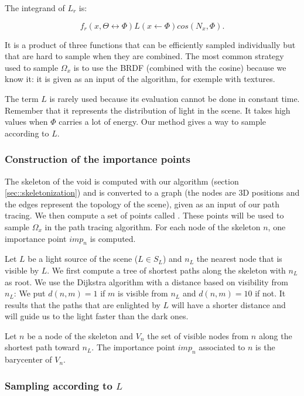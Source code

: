 The integrand of $L_r$ is:

\begin{equation*}
f_r(x, \Theta \leftrightarrow \Phi) L(x \leftarrow \Phi) cos(N_x, \Phi).
\end{equation*}

It is a product of three functions that can be efficiently sampled individually but that are hard to sample when they are combined. The most common strategy used to sample $\Omega_x$ is to use the BRDF (combined with the cosine) because we know it: it is given as an input of the algorithm, for exemple with textures.

The term $L$ is rarely used because its evaluation cannot be done in constant time. Remember that it represents the distribution of light in the scene. It takes high values when $\Phi$ carries a lot of energy. Our method gives a way to sample according to $L$.

\subsubsection{Construction of the importance points}

The skeleton of the void is computed with our algorithm (section \ref{sec::skeletonization}) and is converted to a graph (the nodes are 3D positions and the edges represent the topology of the scene), given as an input of our path tracing. We then compute a set of points called . These points will be used to sample $\Omega_x$ in the path tracing algorithm. For each node of the skeleton $n$, one importance point $imp_n$ is computed.

Let $L$ be a light source of the scene ($L \in S_L$) and $n_L$ the nearest node that is visible by $L$. We first compute a tree of shortest paths along the skeleton with $n_L$ as root. We use the Dijkstra algorithm with a distance based on visibility from $n_L$: We put $d(n, m) = 1$ if $m$ is visible from $n_L$ and $d(n, m) = 10$ if not. It results that the paths that are enlighted by $L$ will have a shorter distance and will guide us to the light faster than the dark ones.

Let $n$ be a node of the skeleton and $V_n$ the set of visible nodes from $n$ along the shortest path toward $n_L$. The importance point $imp_n$ associated to $n$ is the barycenter of $V_n$.

\subsubsection{Sampling according to $L$}

